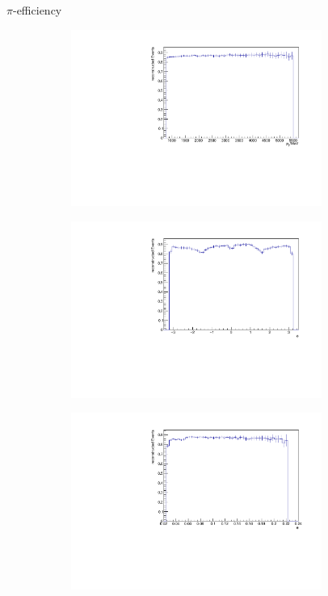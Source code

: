 \documentclass[11pt]{beamer}
\begin{document}
\begin{frame}{$\pi$-efficiency}
\begin{figure}
\begin{subfigure}{0.45\textwidth}
\includegraphics[width=0.9\textwidth]{up_pdf/neg/h_pt_reco_Pi_neg.pdf}
\end{subfigure}
\begin{subfigure}{0.45\textwidth}
\includegraphics[width=0.9\textwidth]{up_pdf/neg/h_phi_reco_Pi_neg.pdf}
\end{subfigure}
\begin{subfigure}{0.45\textwidth}
\includegraphics[width=0.9\textwidth]{up_pdf/neg/h_theta_reco_Pi_neg.pdf}

\end{subfigure}
\end{figure}
\end{frame}
\end{document}
